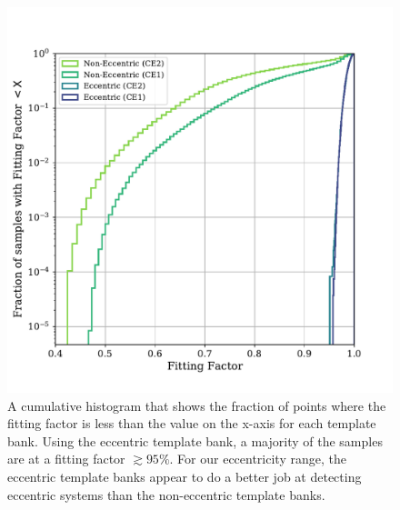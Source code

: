\begin{figure}
    \includegraphics[width=1.1\columnwidth]{Figures/3G-bns-search-prospects/cumhist-ff-CB.pdf}
    \caption{A cumulative histogram that shows the fraction of points where the fitting factor is less than the value on the x-axis for each template bank. Using the eccentric template bank, a majority of the samples are at a fitting factor $\gtrsim 95\%$. For our eccentricity range, the eccentric template banks appear to do a better job at detecting eccentric systems than the non-eccentric template banks.}
\label{Fig:cumul-hist}
\end{figure}

